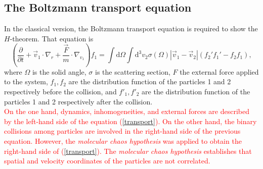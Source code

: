 \documentclass{article}
\begin{document}
\subsection{The Boltzmann transport equation}
In the classical version, the Boltzmann transport equation is required to show the $H$-theorem. That equation is
\begin{equation}
    \left( \frac{\partial }{\partial t}+\vec{v}_1 \cdot \nabla_r +\frac{\vec{F}}{m} \cdot \nabla_{v_1} \right)f_1=\int \mathrm{d}\Omega \int \mathrm{d}^{3}v_2\sigma(\Omega)|\vec{v}_1-\vec{v}_2|(f_2'f_1'-f_2f_1), \label{transport}
\end{equation}
where $\Omega$ is the solid angle, $\sigma$ is the scattering section, $F$ the external force applied to the system, $f_1, f_2$ are the distribution function of the particles 1 and 2 respectively before the collision, and $f'_1, f'_2$ are the distribution function of the particles 1 and 2 respectively after the collision.\\
\textcolor{red}{On the one hand, dynamics, inhomogeneities, and external forces are described by the left-hand side of the equation (\ref{transport}). On the other hand, the binary collisions among particles are involved in the right-hand side of the previous equation. However, the \textit{molecular chaos hypothesis} was applied to obtain the right-hand side of (\ref{transport}). The \textit{molecular chaos hypothesis} establishes that spatial and velocity coordinates of the particles are not correlated.}
\end{document}
